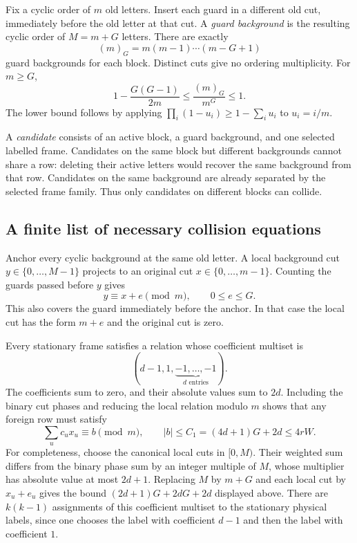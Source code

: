 Fix a cyclic order of $m$ old letters. Insert each guard in a different
old cut, immediately before the old letter at that cut. A \emph{guard
background} is the resulting cyclic order of $M=m+G$ letters. There are
exactly
\[
 (m)_G=m(m-1)\cdots(m-G+1)
\]
guard backgrounds for each block. Distinct cuts give no ordering
multiplicity. For $m\ge G$,
\begin{equation}\label{eq-guard-count}
 1-\frac{G(G-1)}{2m}\le\frac{(m)_G}{m^G}\le1.
\end{equation}
The lower bound follows by applying
$\prod_i(1-u_i)\ge1-\sum_i u_i$ to $u_i=i/m$.

A \emph{candidate} consists of an active block, a guard background, and
one selected labelled frame. Candidates on the same block but different
backgrounds cannot share a row: deleting their active letters would recover
the same background from that row. Candidates on the same background are
already separated by the selected frame family. Thus only candidates on
different blocks can collide.

\subsection{A finite list of necessary collision equations}

Anchor every cyclic background at the same old letter. A local background
cut $y\in\{0,\ldots,M-1\}$ projects to an original cut
$x\in\{0,\ldots,m-1\}$. Counting the guards passed before $y$ gives
\[
 y\equiv x+e\pmod m,\qquad 0\le e\le G.
\]
This also covers the guard immediately before the anchor. In that case
the local cut has the form $m+e$ and the original cut is zero.

Every stationary frame satisfies a relation whose coefficient multiset is
\[
 (d-1,1,\underbrace{-1,\ldots,-1}_{d\text{ entries}}).
\]
The coefficients sum to zero, and their absolute values sum to $2d$.
Including the binary cut phases and reducing the local relation modulo
$m$ shows that any foreign row must satisfy
\begin{equation}\label{eq-foreign-relation}
 \sum_u c_u x_u\equiv b\pmod m,\qquad
 |b|\le C_1=(4d+1)G+2d\le4rW.
\end{equation}
For completeness, choose the canonical local cuts in $[0,M)$.
Their weighted sum differs from the binary phase sum by an integer
multiple of $M$, whose multiplier has absolute value at most $2d+1$.
Replacing $M$ by $m+G$ and each local cut by $x_u+e_u$ gives the bound
$(2d+1)G+2dG+2d$ displayed above.
There are $k(k-1)$ assignments of this coefficient multiset to the
stationary physical labels, since one chooses the label with coefficient
$d-1$ and then the label with coefficient $1$.


